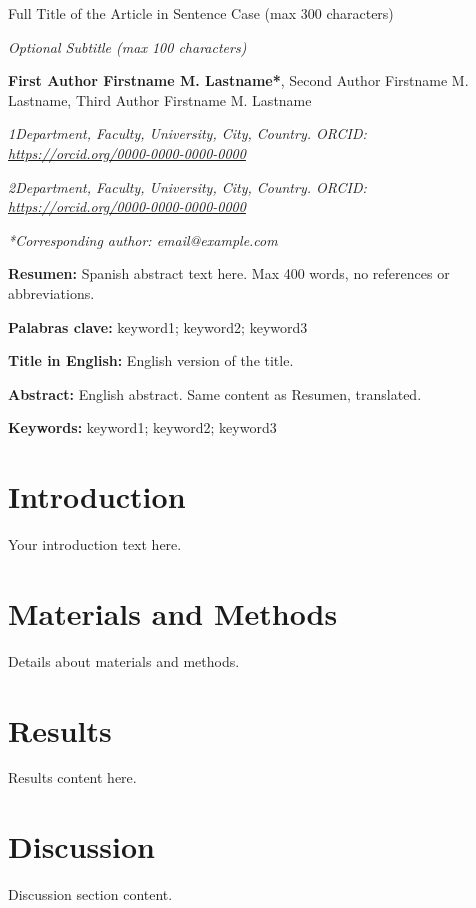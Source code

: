 \documentclass[12pt,a4paper]{article}
\title{}
\date{}
\newcommand{\papertitle}[1]{
  \begin{center}
    {\normalsize #1}
  \end{center}
}
\newcommand{\papersubtitle}[1]{
  \begin{center}
    {\normalsize \textit{#1}}
  \end{center}
}
\begin{document}
\papertitle{Full Title of the Article in Sentence Case (max 300 characters)}
\papersubtitle{Optional Subtitle (max 100 characters)}

\vspace{1em}

\textbf{First Author Firstname M. Lastname*}, Second Author Firstname M. Lastname, Third Author Firstname M. Lastname

\textit{1Department, Faculty, University, City, Country. ORCID: \url{https://orcid.org/0000-0000-0000-0000}}

\textit{2Department, Faculty, University, City, Country. ORCID: \url{https://orcid.org/0000-0000-0000-0000}}

\textit{*Corresponding author: email@example.com}

\vspace{1em}

\textbf{Resumen:} Spanish abstract text here. Max 400 words, no references or abbreviations.

\vspace{1em}

\textbf{Palabras clave:} keyword1; keyword2; keyword3

\vspace{1em}

\textbf{Title in English:} English version of the title.

\vspace{1em}

\textbf{Abstract:} English abstract. Same content as Resumen, translated.

\vspace{1em}

\textbf{Keywords:} keyword1; keyword2; keyword3

\section{Introduction}
Your introduction text here.

\section{Materials and Methods}
Details about materials and methods.

\section{Results}
Results content here.

\section{Discussion}
Discussion section content.
\end{document}
